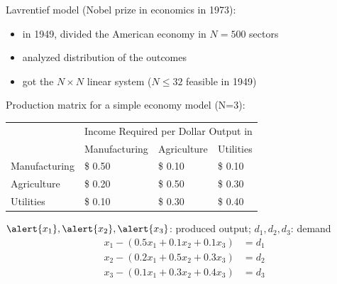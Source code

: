 \documentclass%
[handout]%
{beamer}
\begin{document}

\begin{frame}[label=linear-example1]{Lavrentief model (Nobel prize in economics in 1973):}
\vspace*{-5pt}
\begin{itemize}
    \item in 1949, divided the American economy in $N=500$ sectors %
    \item analyzed distribution of the outcomes
    \item got the $N\times N$ linear system ($N\le 32$ feasible in 1949)
\end{itemize}
\vspace*{-5pt}
\begin{block}
{Production matrix for a simple economy model (N=3):}
\begin{center}\begin{tabular}{|l|l|l|l|}
 \hline
 &\multicolumn{3}{c}{Income Required per Dollar Output in} \vline\\
 \cline{2-4}
 &  Manufacturing & Agriculture &Utilities \hphantom{www} \\
 \hline
Manufacturing & \$ 0.50 & \$ 0.10 & \$ 0.10 \\
Agriculture & \$ 0.20 &\$ 0.50 &\$ 0.30 \\
Utilities &\$ 0.10 &\$ 0.30 &\$ 0.40 \\
\hline
\end{tabular}\end{center}
$\alert{x_1},\alert{x_2},\alert{x_3}$: produced output; $d_1,d_2,d_3$: demand\\[-20pt]
\begin{align*}
 x_1 - (0.5x_1 + 0.1x_2 + 0.1x_3) &= d_1\\
  x_2 - (0.2x_1 + 0.5x_2 + 0.3x_3) &= d_2\\
  x_3 - (0.1x_1 + 0.3x_2 + 0.4x_3) &= d_3
\end{align*}
\end{block}

\end{frame}

\end{document}
